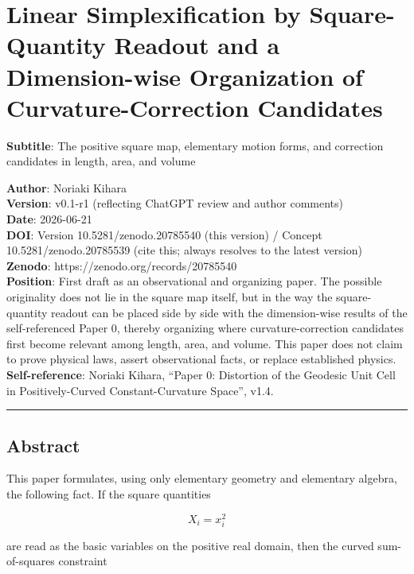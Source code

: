 \documentclass[
]{ltjsarticle}
\author{}
\date{}
\begin{document}
\section{Linear Simplexification by Square-Quantity Readout and a
Dimension-wise Organization of Curvature-Correction
Candidates}\label{linear-simplexification-by-square-quantity-readout-and-a-dimension-wise-organization-of-curvature-correction-candidates}

\textbf{Subtitle}: The positive square map, elementary motion forms, and
correction candidates in length, area, and volume

\textbf{Author}: Noriaki Kihara\\
\textbf{Version}: v0.1-r1 (reflecting ChatGPT review and author
comments)\\
\textbf{Date}: 2026-06-21\\
\textbf{DOI}: Version 10.5281/zenodo.20785540 (this version) / Concept
10.5281/zenodo.20785539 (cite this; always resolves to the latest
version)\\
\textbf{Zenodo}: https://zenodo.org/records/20785540\\
\textbf{Position}: First draft as an observational and organizing paper.
The possible originality does not lie in the square map itself, but in
the way the square-quantity readout can be placed side by side with the
dimension-wise results of the self-referenced Paper 0, thereby
organizing where curvature-correction candidates first become relevant
among length, area, and volume. This paper does not claim to prove
physical laws, assert observational facts, or replace established
physics.\\
\textbf{Self-reference}: Noriaki Kihara, ``Paper 0: Distortion of the
Geodesic Unit Cell in Positively-Curved Constant-Curvature Space'',
v1.4.

\begin{center}\rule{0.5\linewidth}{0.5pt}\end{center}

\subsection{Abstract}\label{abstract}

This paper formulates, using only elementary geometry and elementary
algebra, the following fact. If the square quantities

\[
X_i=x_i^2
\]

are read as the basic variables on the positive real domain, then the
curved sum-of-squares constraint
\end{document}
